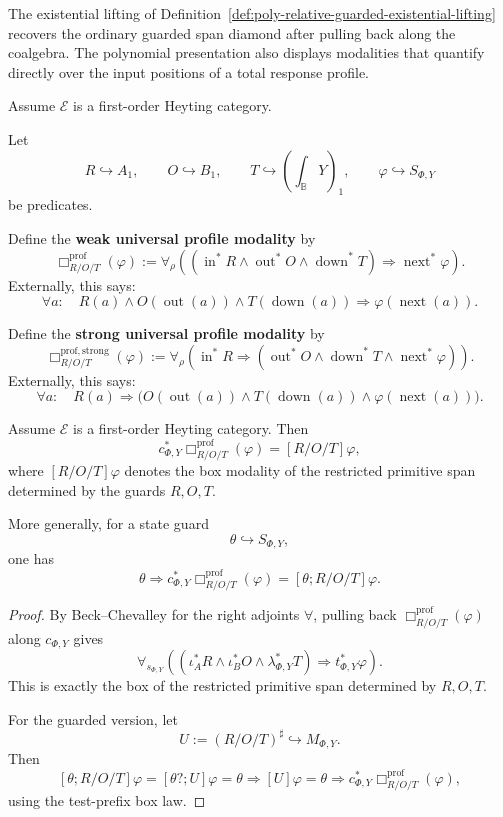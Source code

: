 The existential lifting of
Definition~\ref{def:poly-relative-guarded-existential-lifting} recovers the
ordinary guarded span diamond after pulling back along the coalgebra.  The
polynomial presentation also displays modalities that quantify directly over
the input positions of a total response profile.

Assume \(\mathcal E\) is a first-order Heyting category.

Let
\[
R\hookrightarrow A_1,
\qquad
O\hookrightarrow B_1,
\qquad
T\hookrightarrow\left(\int_{\mathbb B}Y\right)_1,
\qquad
\varphi\hookrightarrow S_{\Phi,Y}
\]
be predicates.

Define the \textbf{weak universal profile modality} by
\[
\Box^{\mathrm{prof}}_{R/O/T}(\varphi)
:=
\forall_{\rho}
\left(
(\operatorname{in}^{\ast}R
\wedge
\operatorname{out}^{\ast}O
\wedge
\operatorname{down}^{\ast}T)
\Rightarrow
\operatorname{next}^{\ast}\varphi
\right).
\]
Externally, this says:
\[
\forall a:
\quad
R(a)\wedge O(\operatorname{out}(a))
\wedge T(\operatorname{down}(a))
\Rightarrow
\varphi(\operatorname{next}(a)).
\]

Define the \textbf{strong universal profile modality} by
\[
\Box^{\mathrm{prof,strong}}_{R/O/T}(\varphi)
:=
\forall_{\rho}
\left(
\operatorname{in}^{\ast}R
\Rightarrow
\left(
\operatorname{out}^{\ast}O
\wedge
\operatorname{down}^{\ast}T
\wedge
\operatorname{next}^{\ast}\varphi
\right)
\right).
\]
Externally, this says:
\[
\forall a:
\quad
R(a)
\Rightarrow
\bigl(
O(\operatorname{out}(a))
\wedge
T(\operatorname{down}(a))
\wedge
\varphi(\operatorname{next}(a))
\bigr).
\]

\begin{theorem}
\label{thm:poly-relative-profile-box-span-agreement}
Assume \(\mathcal E\) is a first-order Heyting category.  Then
\[
c_{\Phi,Y}^{\ast}
\Box^{\mathrm{prof}}_{R/O/T}(\varphi)
=
[R/O/T]\varphi,
\]
where \([R/O/T]\varphi\) denotes the box modality of the restricted primitive
span determined by the guards \(R,O,T\).

More generally, for a state guard
\[
\theta\hookrightarrow S_{\Phi,Y},
\]
one has
\[
\theta\Rightarrow
c_{\Phi,Y}^{\ast}
\Box^{\mathrm{prof}}_{R/O/T}(\varphi)
=
[\theta;R/O/T]\varphi.
\]
\end{theorem}

\begin{proof}
By Beck--Chevalley for the right adjoints \(\forall\), pulling back
\(\Box^{\mathrm{prof}}_{R/O/T}(\varphi)\) along \(c_{\Phi,Y}\) gives
\[
\forall_{s_{\Phi,Y}}
\left(
(\iota_A^\ast R
\wedge
\iota_B^\ast O
\wedge
\lambda_{\Phi,Y}^\ast T)
\Rightarrow
t_{\Phi,Y}^\ast\varphi
\right).
\]
This is exactly the box of the restricted primitive span determined by
\(R,O,T\).

For the guarded version, let
\[
U:=(R/O/T)^\sharp\hookrightarrow M_{\Phi,Y}.
\]
Then
\[
[\theta;R/O/T]\varphi
=
[\theta?;U]\varphi
=
\theta\Rightarrow[U]\varphi
=
\theta\Rightarrow
c_{\Phi,Y}^{\ast}
\Box^{\mathrm{prof}}_{R/O/T}(\varphi),
\]
using the test-prefix box law.
\end{proof}

